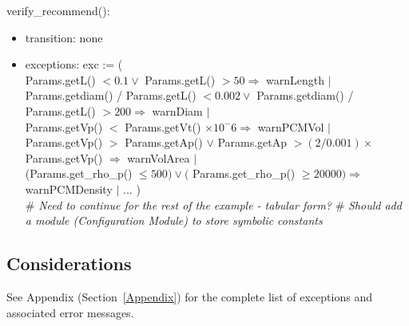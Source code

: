 \documentclass[12pt]{article}
\begin{document}
verify\_recommend():
\begin{itemize}
\item transition: none
\item exceptions: exc := (\\
Params.getL() $< 0.1 \lor$ Params.getL() $> 50 \Rightarrow$ warnLength $|$\\
Params.getdiam() / Params.getL() $< 0.002 \lor$ Params.getdiam() / Params.getL() $> 200
\Rightarrow$ warnDiam $|$\\
Params.getVp() $<$ Params.getVt() $\times 10 ^ -6 \Rightarrow$ warnPCMVol $|$\\
Params.getVp() $>$ Params.getAp() $\lor$ Params.getAp $> (2/0.001) \times$ Params.getVp()
$\Rightarrow$ warnVolArea $|$\\
(Params.get\_rho\_p() $\leq 500) \lor ($ Params.get\_rho\_p() $\geq 20000) \Rightarrow$
warnPCMDensity $|$ ... )\\
\# \textit{Need to continue for the rest of the example - tabular form?}
\# \textit{Should add a module (Configuration Module) to store symbolic constants}
\end{itemize}

\subsection{Considerations}

See Appendix (Section~\ref{Appendix}) for the complete list of exceptions and
associated error messages.
\end{document}
